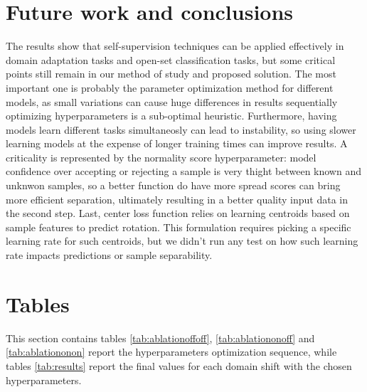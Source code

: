 \documentclass[10pt,twocolumn,letterpaper]{article}
\begin{document}
\section{Future work and conclusions}
\label{sec:future_work}

The results show that self-supervision techniques can be applied effectively in domain adaptation tasks and open-set classification tasks,
but some critical points still remain in our method of study and proposed solution.
The most important one is probably the parameter optimization method for different models,
as small variations can cause huge differences in results sequentially optimizing hyperparameters is a sub-optimal heuristic.
Furthermore,
having models learn different tasks simultaneosly can lead to instability, 
so using slower learning models at the expense of longer training times can improve results.
A criticality is represented by the normality score hyperparameter:
model confidence over accepting or rejecting a sample is very thight between known and unknwon samples,
so a better function do have more spread scores can bring more efficient separation,
ultimately resulting in a better quality input data in the second step.
Last,
center loss function relies on learning centroids based on sample features to predict rotation.
This formulation requires picking a specific learning rate for such centroids,
but we didn't run any test on how such learning rate impacts predictions or sample separability.


\appendix

\section{Tables}
\label{sec:tables}

This section contains tables \ref{tab:ablationoffoff}, \ref{tab:ablationonoff} and \ref{tab:ablationonon} report the hyperparameters optimization sequence, while tables \ref{tab:results} report the final values for each domain shift with the chosen hyperparameters.
\end{document}
